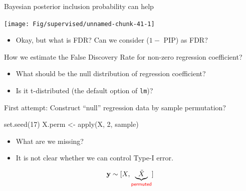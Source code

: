 \documentclass[
  ignorenonframetext,
  aspectratio=169]{beamer}
\newenvironment{Shaded}{\begin{snugshade}}{\end{snugshade}}
\newcommand{\DecValTok}[1]{\textcolor[rgb]{0.00,0.00,0.81}{#1}}
\newcommand{\FunctionTok}[1]{\textcolor[rgb]{0.00,0.00,0.00}{#1}}
\newcommand{\NormalTok}[1]{#1}
\newcommand{\OtherTok}[1]{\textcolor[rgb]{0.56,0.35,0.01}{#1}}
\providecommand{\tightlist}{%
  \setlength{\itemsep}{0pt}\setlength{\parskip}{0pt}}
\begin{document}
\begin{frame}{Bayesian posterior inclusion probability can help}
\protect\hypertarget{bayesian-posterior-inclusion-probability-can-help}{}
\scriptsize

\normalsize

\scriptsize

\begin{center}\texttt{[image: Fig/supervised/unnamed-chunk-41-1]} \end{center}

\normalsize

\begin{itemize}
\tightlist
\item
  Okay, but what is FDR? Can we consider (\(1-\) PIP) as FDR?
\end{itemize}
\end{frame}

\begin{frame}[fragile]{How we estimate the False Discovery Rate for
non-zero regression coefficient?}
\protect\hypertarget{how-we-estimate-the-false-discovery-rate-for-non-zero-regression-coefficient}{}
\Large

\begin{itemize}
\item
  What should be the null distribution of regression coefficient?
\item
  Is it t-distributed (the default option of \texttt{lm})?
\end{itemize}
\end{frame}

\begin{frame}[fragile]{First attempt: Construct ``null'' regression data
by sample permutation?}
\protect\hypertarget{first-attempt-construct-null-regression-data-by-sample-permutation}{}
\large

\begin{Shaded}
\begin{Highlighting}[]
\FunctionTok{set.seed}\NormalTok{(}\DecValTok{17}\NormalTok{)}
\NormalTok{X.perm }\OtherTok{\textless{}{-}} \FunctionTok{apply}\NormalTok{(X, }\DecValTok{2}\NormalTok{, sample)}
\end{Highlighting}
\end{Shaded}

\normalsize

\scriptsize

\normalsize

\Large

\begin{itemize}
\item
  What are we missing?
\item
  It is not clear whether we can control Type-I error.
\end{itemize}

\[\mathbf{y} \sim [X, \underbrace{\tilde{X}}_{\textsf{\color{red} permuted}}]\]
\end{frame}
\end{document}
